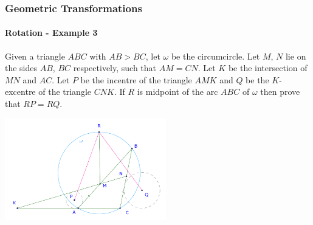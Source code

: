 \documentclass[8pt,xcolor=table,dvipsnames]{beamer}
\begin{document}
\begin{frame}[t]
    \frametitle{Geometric Transformations}
    \framesubtitle{Rotation - Example 3}
    \begin{example}
        Given a triangle $ABC$ with $AB>BC$, let $\omega $ be the circumcircle.
        Let $M$, $N$ lie on the sides $AB$, $BC$ respectively, such that $AM=CN$.
        Let $K$ be the intersection of $MN$ and $AC$.
        Let $P$ be the incentre of the triangle $AMK$ and $Q$ be the $K$-excentre of the triangle $CNK$.
        If $R$ is midpoint of the arc $ABC$ of $\omega $ then prove that $RP=RQ$.
    \end{example}

    \bigbreak
    \begin{center}
        \includegraphics[width=7cm]{./svg/pdf/24-25-t3-p15-0.pdf}
    \end{center}
\end{frame}
\end{document}
